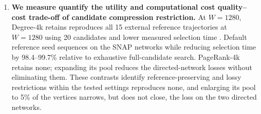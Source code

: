 \documentclass[smallextended]{svjour3}
\providecommand{\DIFaddtex}[1]{{\protect\color{blue} \sf #1}} %
\providecommand{\DIFdeltex}[1]{{\protect\color{red} \scriptsize #1}} %
\providecommand{\DIFaddbegin}{} %
\providecommand{\DIFaddend}{} %
\providecommand{\DIFdelbegin}{} %
\providecommand{\DIFdelend}{} %
\providecommand{\DIFadd}[1]{\texorpdfstring{\DIFaddtex{#1}}{#1}} %
\providecommand{\DIFdel}[1]{\texorpdfstring{\DIFdeltex{#1}}{}} %
\providecommand{\DIFscaledelfig}{0.5}
\newlength{\DIFdelgraphicswidth} %
\newlength{\DIFdelgraphicsheight} %
\providecommand{\DIFaddincludegraphics}[2][]{{\color{blue}\fbox{\DIFOincludegraphics[#1]{#2}}}} %
\providecommand{\DIFdelincludegraphics}[2][]{%
\sbox{\DIFdelgraphicsbox}{\DIFOincludegraphics[#1]{#2}}%
\settoboxwidth{\DIFdelgraphicswidth}{\DIFdelgraphicsbox} %
\settoboxtotalheight{\DIFdelgraphicsheight}{\DIFdelgraphicsbox} %
\scalebox{\DIFscaledelfig}{%
\parbox[b]{\DIFdelgraphicswidth}{\usebox{\DIFdelgraphicsbox}\\[-\baselineskip] \rule{\DIFdelgraphicswidth}{0em}}\llap{\resizebox{\DIFdelgraphicswidth}{\DIFdelgraphicsheight}{%
\setlength{\unitlength}{\DIFdelgraphicswidth}%
\begin{picture}(1,1)%
\thicklines\linethickness{2pt} %
{\color[rgb]{1,0,0}\put(0,0){\framebox(1,1){}}}%
{\color[rgb]{1,0,0}\put(0,0){\line( 1,1){1}}}%
{\color[rgb]{1,0,0}\put(0,1){\line(1,-1){1}}}%
\end{picture}%
}\hspace*{3pt}}} %
} %
\DeclareRobustCommand{\DIFaddbegin}{\DIFOaddbegin \let\includegraphics\DIFaddincludegraphics} %
\DeclareRobustCommand{\DIFaddend}{\DIFOaddend \let\includegraphics\DIFOincludegraphics} %
\DeclareRobustCommand{\DIFdelbegin}{\DIFOdelbegin \let\includegraphics\DIFdelincludegraphics} %
\DeclareRobustCommand{\DIFdelend}{\DIFOaddend \let\includegraphics\DIFOincludegraphics} %
\begin{document}
\begin{enumerate}
{}\DIFaddend \item[(3)] \textbf{We \DIFdelbegin \DIFdel{measure }\DIFdelend \DIFaddbegin \DIFadd{quantify }\DIFaddend the \DIFdelbegin \DIFdel{utility and computational cost }\DIFdelend \DIFaddbegin \DIFadd{quality--cost trade-off }\DIFaddend of candidate \DIFdelbegin \DIFdel{compression}\DIFdelend \DIFaddbegin \DIFadd{restriction}\DIFaddend .} \DIFaddbegin \DIFadd{At $W=1280$, }\DIFaddend Degree-4k \DIFdelbegin \DIFdel{retains }\DIFdelend \DIFaddbegin \DIFadd{reproduces }\DIFaddend all 15 \DIFdelbegin \DIFdel{external reference trajectories at $W=1280$ using 20 candidates and lower measured selection time . Default }\DIFdelend \DIFaddbegin \DIFadd{reference seed sequences on the SNAP networks while reducing selection time by 98.4--99.7\% relative to exhaustive full-candidate search. }\DIFaddend PageRank-4k \DIFdelbegin \DIFdel{retains none; expanding its pool reduces the directed-network losses without eliminating them. These contrasts identify reference-preserving and lossy restrictions within the tested settings}\DIFdelend \DIFaddbegin \DIFadd{reproduces none, and enlarging its pool to 5\% of the vertices narrows, but does not close, the loss on the two directed networks}\DIFaddend .
\end{enumerate}
\end{document}
